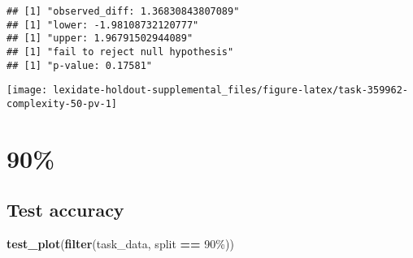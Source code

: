 \documentclass[
]{book}
\newenvironment{Shaded}{\begin{snugshade}}{\end{snugshade}}
\newcommand{\AttributeTok}[1]{\textcolor[rgb]{0.13,0.29,0.53}{#1}}
\newcommand{\DecValTok}[1]{\textcolor[rgb]{0.00,0.00,0.81}{#1}}
\newcommand{\FunctionTok}[1]{\textcolor[rgb]{0.13,0.29,0.53}{\textbf{#1}}}
\newcommand{\NormalTok}[1]{#1}
\newcommand{\OtherTok}[1]{\textcolor[rgb]{0.56,0.35,0.01}{#1}}
\newcommand{\SpecialCharTok}[1]{\textcolor[rgb]{0.81,0.36,0.00}{\textbf{#1}}}
\newcommand{\StringTok}[1]{\textcolor[rgb]{0.31,0.60,0.02}{#1}}
\begin{document}
\begin{Shaded}
\end{Shaded}

\begin{verbatim}
## [1] "observed_diff: 1.36830843807089"
## [1] "lower: -1.98108732120777"
## [1] "upper: 1.96791502944089"
## [1] "fail to reject null hypothesis"
## [1] "p-value: 0.17581"
\end{verbatim}

\texttt{[image: lexidate-holdout-supplemental\_files/figure-latex/task-359962-complexity-50-pv-1]}

\hypertarget{section-58}{%
\section{90\%}\label{section-58}}

\hypertarget{test-accuracy-58}{%
\subsection{Test accuracy}\label{test-accuracy-58}}

\begin{Shaded}
\begin{Highlighting}[]
\FunctionTok{test\_plot}\NormalTok{(}\FunctionTok{filter}\NormalTok{(task\_data, split }\SpecialCharTok{==} \StringTok{\textquotesingle{}90\%\textquotesingle{}}\NormalTok{))}
\end{Highlighting}
\end{Shaded}
\end{document}
